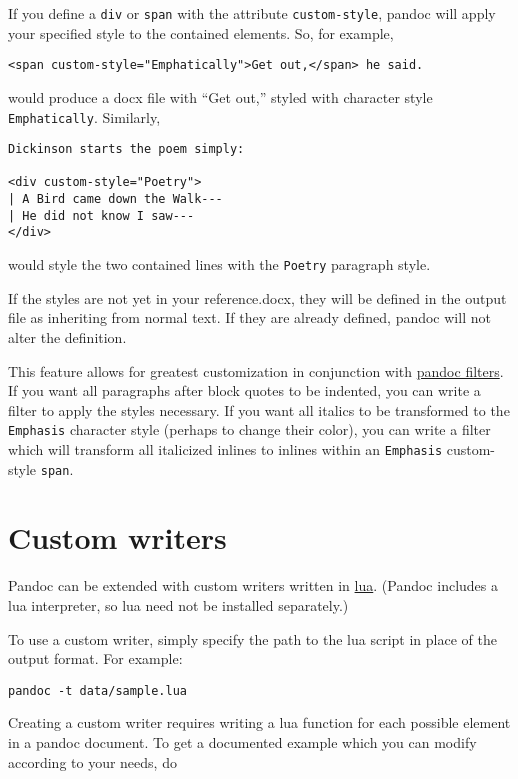 \documentclass[]{article}
\begin{document}
If you define a \texttt{div} or \texttt{span} with the attribute
\texttt{custom-style}, pandoc will apply your specified style to the
contained elements. So, for example,

\begin{verbatim}
<span custom-style="Emphatically">Get out,</span> he said.
\end{verbatim}

would produce a docx file with ``Get out,'' styled with character style
\texttt{Emphatically}. Similarly,

\begin{verbatim}
Dickinson starts the poem simply:

<div custom-style="Poetry">
| A Bird came down the Walk---
| He did not know I saw---
</div>
\end{verbatim}

would style the two contained lines with the \texttt{Poetry} paragraph
style.

If the styles are not yet in your reference.docx, they will be defined
in the output file as inheriting from normal text. If they are already
defined, pandoc will not alter the definition.

This feature allows for greatest customization in conjunction with
\href{http://pandoc.org/scripting.html}{pandoc filters}. If you want all
paragraphs after block quotes to be indented, you can write a filter to
apply the styles necessary. If you want all italics to be transformed to
the \texttt{Emphasis} character style (perhaps to change their color),
you can write a filter which will transform all italicized inlines to
inlines within an \texttt{Emphasis} custom-style \texttt{span}.

\hypertarget{custom-writers}{\section{Custom
writers}\label{custom-writers}}

Pandoc can be extended with custom writers written in
\href{http://www.lua.org}{lua}. (Pandoc includes a lua interpreter, so
lua need not be installed separately.)

To use a custom writer, simply specify the path to the lua script in
place of the output format. For example:

\begin{verbatim}
pandoc -t data/sample.lua
\end{verbatim}

Creating a custom writer requires writing a lua function for each
possible element in a pandoc document. To get a documented example which
you can modify according to your needs, do
\end{document}
